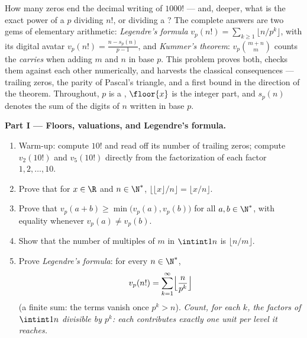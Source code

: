 \begin{problem}\label{pb:b1:arith:1}
How many zeros end the decimal writing of $1000!$ --- and, deeper,
what is the exact power of a  $p$ dividing $n!$, or dividing a
? The complete answers are two gems of
elementary arithmetic: \emph{Legendre's formula}
 $v_p(n!) = \sum_{k\geq1}
\lfloor n/p^k \rfloor$, with its digital avatar $v_p(n!) = \frac{n
- s_p(n)}{p-1}$, and \emph{Kummer's theorem}: $v_p\binom{m+n}m$ counts the \emph{carries} when adding
$m$ and $n$ in base $p$. This problem proves both, checks them
against each other numerically, and harvests the classical
consequences --- trailing zeros, the parity of Pascal's triangle,
and a first bound in the direction of the  theorem.
Throughout, $p$ is a , $\floor{x}$ is the integer part, and
$s_p(n)$ denotes the sum of the digits of $n$ written in base $p$.

\medskip
\noindent\textbf{Part I --- Floors, valuations, and Legendre's
formula.}
\begin{enumerate}
  \item Warm-up: compute $10!$ and read off its number of trailing
        zeros; compute $v_2(10!)$ and $v_5(10!)$ directly from the
        factorization of each factor $1, 2, \dots, 10$.
  \item Prove that for $x \in \R$ and $n \in \N^*$,
        $\bigl\lfloor \lfloor x \rfloor / n \bigr\rfloor =
        \lfloor x/n \rfloor$.
  \item Prove that $v_p(a + b) \geq \min\bigl(v_p(a),
        v_p(b)\bigr)$ for all $a, b \in \N^*$, with equality
        whenever $v_p(a) \neq v_p(b)$.
  \item Show that the number of multiples of $m$ in $\intint1n$ is
        $\lfloor n/m \rfloor$.
  \item Prove \emph{Legendre's formula}: for every $n \in \N^*$,
        \[
        v_p(n!) = \sum_{k=1}^{\infty}
        \Bigl\lfloor \frac{n}{p^k} \Bigr\rfloor
        \]
        (a finite sum: the terms vanish once $p^k > n$).
        \emph{Count, for each $k$, the factors of $\intint1n$
        divisible by $p^k$: each contributes exactly one unit per
        level it reaches.}
\end{enumerate}


\end{problem}

